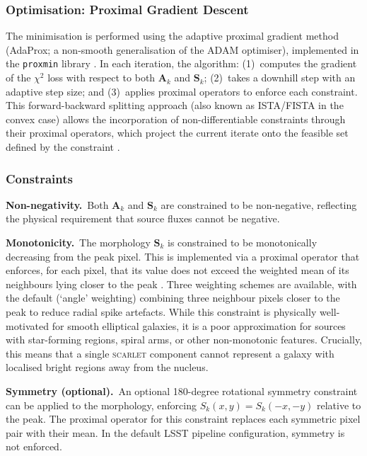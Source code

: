 \documentclass[DM,lsstdraft,authoryear,toc]{lsstdoc}
\newcommand{\scarlet}{\textsc{scarlet}\xspace}
\begin{document}
\subsubsection{Optimisation: Proximal Gradient Descent}
\label{sec:optimisation}

The minimisation is performed using the adaptive proximal gradient method
(AdaProx; a non-smooth generalisation of the ADAM optimiser), implemented in
the \texttt{proxmin} library \citep{MoolekampMelchior2018}. In each
iteration, the algorithm: (1)~computes the gradient of the $\chi^2$ loss
with respect to both $\mathbf{A}_k$ and $\mathbf{S}_k$; (2)~takes a downhill
step with an adaptive step size; and (3)~applies proximal operators to
enforce each constraint. This forward-backward splitting approach (also known
as ISTA/FISTA in the convex case) allows the incorporation of
non-differentiable constraints through their proximal operators, which project
the current iterate onto the feasible set defined by the constraint
\citep{ParikhBoyd2014}.

\subsubsection{Constraints}
\label{sec:constraints}

\textbf{Non-negativity.}\ Both $\mathbf{A}_k$ and $\mathbf{S}_k$ are
constrained to be non-negative, reflecting the physical requirement that
source fluxes cannot be negative.

\textbf{Monotonicity.}\ The morphology $\mathbf{S}_k$ is constrained to be
monotonically decreasing from the peak pixel. This is implemented via a
proximal operator that enforces, for each pixel, that its value does not
exceed the weighted mean of its neighbours lying closer to the peak
\citep{Melchior2018}. Three weighting schemes are available, with the default
(`angle' weighting) combining three neighbour pixels closer to the peak to
reduce radial spike artefacts. While this constraint is physically
well-motivated for smooth elliptical galaxies, it is a poor approximation for
sources with star-forming regions, spiral arms, or other non-monotonic
features. Crucially, this means that a single \scarlet component cannot
represent a galaxy with localised bright regions away from the nucleus.

\textbf{Symmetry (optional).}\ An optional 180-degree rotational symmetry
constraint can be applied to the morphology, enforcing $S_k(x,y) =
S_k(-x,-y)$ relative to the peak. The proximal operator for this constraint
replaces each symmetric pixel pair with their mean. In the default LSST
pipeline configuration, symmetry is not enforced.
\end{document}

